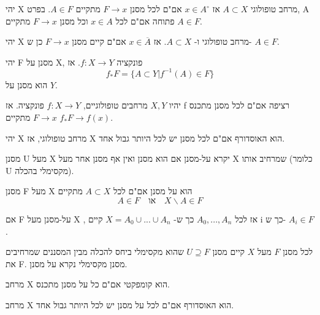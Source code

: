 \documentclass{tstextbook}
\begin{document}
\begin{proposition}
יהי X מרחב טופולוגי \(A\subset X\) אז \(x\in A^{\circ}\) אם"ם לכל מסנן \(F\rightarrow x\) מתקיים \(A\in F\). בפרט, A פתוחה אם"ם לכל \(x\in A\) וכל מסנן \(F\rightarrow x\) מתקיים \(A\in F\).

\end{proposition}
\begin{proposition}
יהי X מרחב טופולוגי ו- \(A\subset X\). אז \(x\in \overline{A}\) אם"ם קיים מסנן \(F\rightarrow x\) כן ש- \(A\in F\).

\end{proposition}
\begin{definition}
יהי F מסנן על X, פונקציה \(f:X\rightarrow Y\). אז
$$f_{*}F=\{A\subset Y|f^{-1}(A)\in F\}$$
הוא מסנן על \(Y\).

\end{definition}
\begin{proposition}
יהיו \(X,Y\) מרחבים טופולוגיים, \(f:X\rightarrow Y\) פונקציה. אז f רציפה אם"ם לכל מסנן מתכנס \(F\rightarrow x\) מתקיים \(f_{*}F\rightarrow f(x)\).

\end{proposition}
\begin{proposition}
יהי X מרחב טופולוגי, אז X הוא האוסדורף אם"ם לכל מסנן יש לכל היותר גבול אחד.

\end{proposition}
\begin{definition}[על-מסנן]
מסנן U מעל X יקרא על-מסנן אם הוא מסנן ואין אף מסנן אחר מעל X שמרחיב אותו (כלומר U מקסימלי בהכלה).

\end{definition}
\begin{proposition}
מסנן F מעל X הוא על מסנן אם"ם לכל \(A\subset X\) מתקיים
$$A\in F \quad \text{או} \quad X\backslash A\in F$$

\end{proposition}
\begin{proposition}
אם F על-מסנן מעל X , אז לכל \(A_{0},...,A_{n}\) כך ש- \(X=A_{0}\cup...\cup A_{n}\) קיים i כך ש- \(A_{i}\in F\).

\end{proposition}
\begin{proposition}
לכל מסנן \(F\) מעל \(X\) קיים מסנן \(U\supseteq F\) שהוא מקסימלי ביחס להכלה מבין המסננים שמרחיבים את F. מסנן מקסימלי נקרא על מסנן.

\end{proposition}
\begin{proposition}
מרחב X הוא קומפקטי אם"ם כל על מסנן מתכנס.

\end{proposition}
\begin{proposition}
מרחב X הוא האוסדורף אם"ם לכל על מסנן יש לכל היותר גבול אחד.

\end{proposition}
\end{document}
